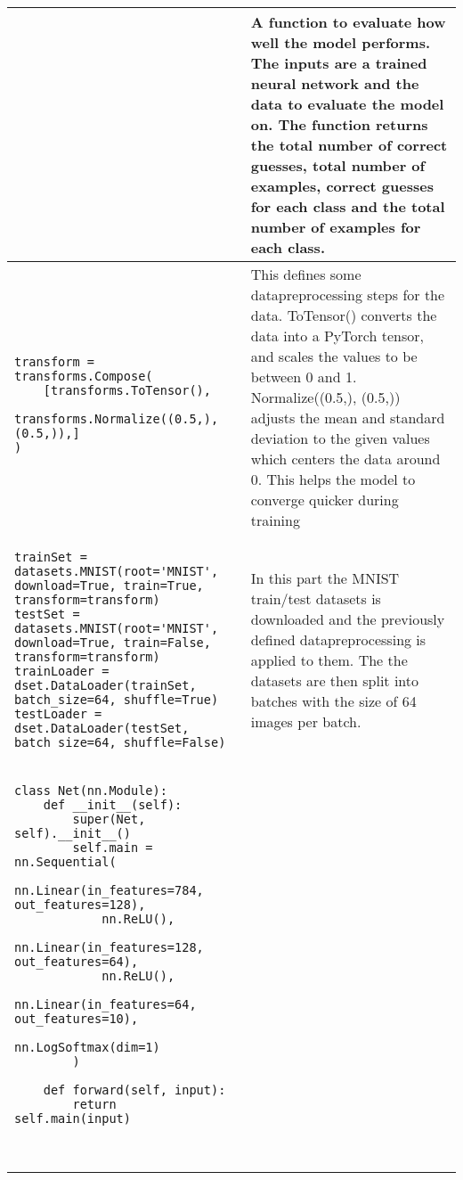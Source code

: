 \begin{longtable}{|m{}|m{}|}
\begin{lstlisting}
\end{lstlisting} & A function to evaluate how well the model performs. The inputs are a trained neural network and the data to evaluate the model on. The function returns the total number of correct guesses, total number of examples, correct guesses for each class and the total number of examples for each class.   \\ \hline

\begin{lstlisting}

transform = transforms.Compose(
    [transforms.ToTensor(),
     transforms.Normalize((0.5,), (0.5,)),]
)
\end{lstlisting} & This defines some datapreprocessing steps for the data. ToTensor() converts the data into a PyTorch tensor, and scales the values to be between 0 and 1. Normalize((0.5,), (0.5,)) adjusts the mean and standard deviation to the given values which centers the data around 0. This helps the model to converge quicker during training\\ \hline

\begin{lstlisting}
trainSet = datasets.MNIST(root='MNIST', download=True, train=True, transform=transform)
testSet = datasets.MNIST(root='MNIST', download=True, train=False, transform=transform)
trainLoader = dset.DataLoader(trainSet, batch_size=64, shuffle=True)
testLoader = dset.DataLoader(testSet, batch_size=64, shuffle=False)
\end{lstlisting} & In this part the MNIST train/test datasets is downloaded and the previously defined datapreprocessing is applied to them. The the datasets are then split into batches with the size of 64 images per batch. \\ \hline


\begin{lstlisting}
class Net(nn.Module):
    def __init__(self):
        super(Net, self).__init__()
        self.main = nn.Sequential(
            nn.Linear(in_features=784, out_features=128),
            nn.ReLU(),
            nn.Linear(in_features=128, out_features=64),
            nn.ReLU(),
            nn.Linear(in_features=64, out_features=10),
            nn.LogSoftmax(dim=1)
        )

    def forward(self, input):
        return self.main(input)



\end{lstlisting}
\end{longtable}
